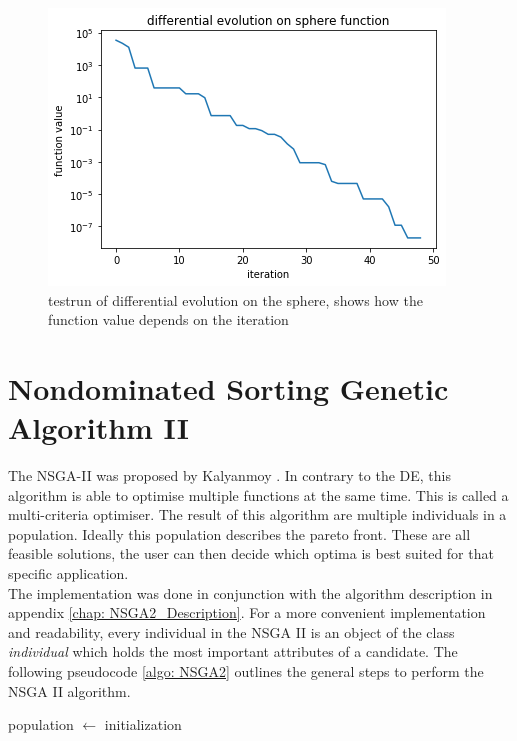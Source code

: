 \documentclass[./\jobname.tex]{subfiles}
\begin{document}
\begin{figure}[H]
	\centering
	\includegraphics[width=0.9\linewidth]{../img/png/differential_evolution_varification.png}
	\caption{testrun of differential evolution on the sphere, shows how the function value depends on the iteration}
	\label{fig:de_verification}
\end{figure}

\section{Nondominated Sorting Genetic Algorithm II}
The NSGA-II was proposed by Kalyanmoy \cite{deb_fast_2002}. In contrary to the DE, this algorithm is able to optimise multiple functions at the same time. This is called a multi-criteria optimiser. The result of this algorithm are multiple individuals in a population. Ideally this population describes the pareto front. These are all feasible solutions, the user can then decide which optima is best suited for that specific application. \\

The implementation was done in conjunction with the algorithm description in appendix \ref{chap: NSGA2_Description}. For a more convenient implementation and readability, every individual in the NSGA II is an object of the class \textit{individual} which holds the most important attributes of a candidate. The following pseudocode \ref{algo: NSGA2} outlines the general steps to perform the NSGA II algorithm. 

\begin{algorithm}[H]
	\SetAlgoNoLine
	\DontPrintSemicolon
	population $\gets$ initialization\;
	\label{algo: NSGA2}
\end{algorithm}
\end{document}
